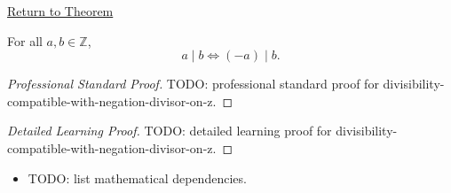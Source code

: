 \newpage
{}
\label{prf:divisibility-compatible-with-negation-divisor-on-z}

\begin{remark*}[Return]
\hyperref[prop:divisibility-compatible-with-negation-divisor-on-z]{Return to Theorem}
\end{remark*}

\begin{proposition*}
For all $a,b\in\mathbb{Z}$,
\[
a\mid b \Longleftrightarrow (-a)\mid b.
\]
\end{proposition*}

\begin{proof}[Professional Standard Proof]
\LRAProofBodyStart
TODO: professional standard proof for divisibility-compatible-with-negation-divisor-on-z.
\end{proof}

\begin{proof}[Detailed Learning Proof]
\LRAProofBodyStart
TODO: detailed learning proof for divisibility-compatible-with-negation-divisor-on-z.
\end{proof}

\begin{remark*}
\end{remark*}

\begin{dependencies}
\begin{itemize}
  \item TODO: list mathematical dependencies.
\end{itemize}
\end{dependencies}

\clearpage
